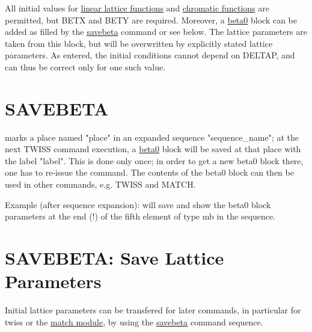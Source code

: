 All initial values for \href{../Introduction/tables.html#linear}{linear
  lattice functions} and
\href{../Introduction/tables.html#chrom}{chromatic functions} are
permitted, but BETX and BETY are required. Moreover, a
\href{beta0}{beta0} block can be added as filled by the
\href{../control/general.html#savebeta}{savebeta} command or see
below. The lattice parameters are taken from this block, but will be
overwritten by explicitly stated lattice parameters. As entered, the
initial conditions cannot depend on DELTAP, and can thus be correct only
for one such value.  



\section{SAVEBETA}
\label{sec:savebeta}
marks a place named "place" in an expanded sequence "sequence\_name"; 
at the next TWISS command execution, a
\href{../twiss/twiss.html#beta0}{beta0} 
block will be saved at that place with the label "label". This is done
only once; in order to get a new beta0 block there, one has to re-issue
the command. The contents of the beta0 block can then be used in other
commands, e.g. TWISS and MATCH.  

Example (after sequence expansion): 
will save and show the beta0 block parameters at the end (!) of the
fifth element of type mb in the sequence.  


\section{SAVEBETA: Save Lattice Parameters}

Initial lattice parameters can be transfered for later commands, in
particular for twiss or the \href{../match/match.html}{match module}, by
using the \href{../control/general.html#savebeta}{savebeta} command
sequence.  

